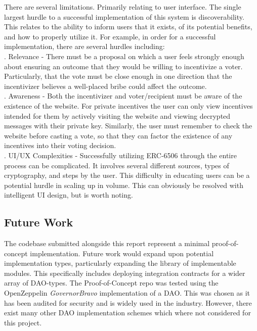 \documentclass{article}
\begin{document}
There are several limitations. Primarily relating to user interface. The single largest hurdle to a successful implementation of this system is discoverability. This relates to the ability to inform users that it exists, of its potential benefits, and how to properly utilize it. For example, in order for a successful implementation, there are several hurdles including:\\

. Relevance - There must be a proposal on which a user feels strongly enough about ensuring an outcome that they would be willing to incentivize a voter. Particularly, that the vote must be close enough in one direction that the incentivizer believes a well-placed bribe could affect the outcome. \\

. Awareness - Both the incentivizer and voter/recipient must be aware of the existence of the website. For private incentives the user can only view incentives intended for them by actively visiting the website and viewing decrypted messages with their private key. Similarly, the user must remember to check the website before casting a vote, so that they can factor the existence of any incentives into their voting decision.\\

. UI/UX Complexities - Successfully utilizing ERC-6506 through the entire process can be complicated. It involves several different sources, types of cryptography, and steps by the user. This difficulty in educating users can be a potential hurdle in scaling up in volume. This can obviously be resolved with intelligent UI design, but is worth noting.

\subsection{Future Work}

The codebase submitted alongside this report represent a minimal proof-of-concept implementation. Future work would expand upon potential implementation types, particularly expanding the library of implementable modules. This specifically includes deploying integration contracts for a wider array of DAO-types. The Proof-of-Concept repo was tested using the OpenZeppelin \emph{GovernorBravo} implementation of a DAO. This was chosen as it has been audited for security and is widely used in the industry. However, there exist many other DAO implementation schemes which where not considered for this project. 
\end{document}
